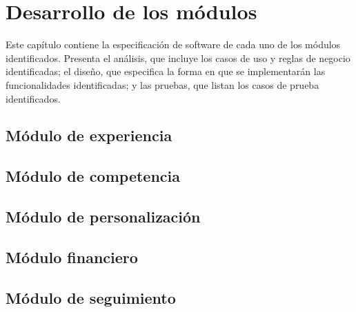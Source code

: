 
\chapter{Desarrollo de los módulos}\label{ch:modulos}

 Este capítulo contiene la especificación de software de cada uno de los módulos
 identificados. Presenta el análisis, que incluye los casos de uso y reglas de
 negocio identificadas; el diseño, que especifica la forma en que se implementarán
 las funcionalidades identificadas; y las pruebas, que listan los casos de prueba
 identificados.

     \label{mod:general}

    \section{Módulo de experiencia}\label{mod:exp}
    

    \section{Módulo de competencia}\label{mod:comp}
    

    \section{Módulo de personalización}\label{mod:pers}
    


    \section{Módulo financiero}\label{mod:financ}
    


    \section{Módulo de seguimiento}\label{mod:seguim}
    
